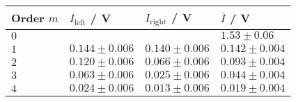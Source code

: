 	\begin{tabular}{|p{3.82cm}|p{3.82cm}|p{3.82cm}|p{3.82cm}|}
		\hline
		\rowcolor{tabcolor}
		Order $m$ & $I_\mathrm{left}$ / V & $I_\mathrm{right}$ / V & $\overline{I}$ / V  \\ \hline
		$0$ & 	 & 	& $1.53 \pm 0.06$ \\ 
		$1$ & $0.144 \pm 0.006$ & $0.140 \pm 0.006$ & $0.142 \pm 0.004$ \\ 
		$2$ & $0.120 \pm 0.006$ & $0.066 \pm 0.006$ & $0.093 \pm 0.004$ \\ 
		$3$ & $0.063 \pm 0.006$ & $0.025 \pm 0.006$ & $0.044 \pm 0.004$ \\ 
		$4$ & $0.024 \pm 0.006$ & $0.013 \pm 0.006$ & $0.019 \pm 0.004$ \\ 
		\hline
	\end{tabular}
